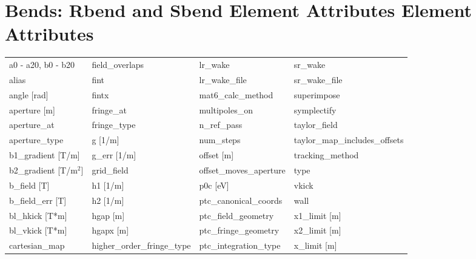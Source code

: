  \section{Bends: Rbend and Sbend Element Attributes Element Attributes}
 \label{s:list.bend}

 \begin{tabular}{llll} \toprule
a0 - a20, b0 - b20             & field_overlaps                 & lr_wake                        & sr_wake                        \\
alias                          & fint                           & lr_wake_file                   & sr_wake_file                   \\
angle [rad]                    & fintx                          & mat6_calc_method               & superimpose                    \\
aperture [m]                   & fringe_at                      & multipoles_on                  & symplectify                    \\
aperture_at                    & fringe_type                    & n_ref_pass                     & taylor_field                   \\
aperture_type                  & g [1/m]                        & num_steps                      & taylor_map_includes_offsets    \\
b1_gradient [T/m]              & g_err [1/m]                    & offset [m]                     & tracking_method                \\
b2_gradient [T/m$^2$]          & grid_field                     & offset_moves_aperture          & type                           \\
b_field [T]                    & h1 [1/m]                       & p0c [eV]                       & vkick                          \\
b_field_err [T]                & h2 [1/m]                       & ptc_canonical_coords           & wall                           \\
bl_hkick [T*m]                 & hgap [m]                       & ptc_field_geometry             & x1_limit [m]                   \\
bl_vkick [T*m]                 & hgapx [m]                      & ptc_fringe_geometry            & x2_limit [m]                   \\
cartesian_map                  & higher_order_fringe_type       & ptc_integration_type           & x_limit [m]                    \\

\end{tabular}
